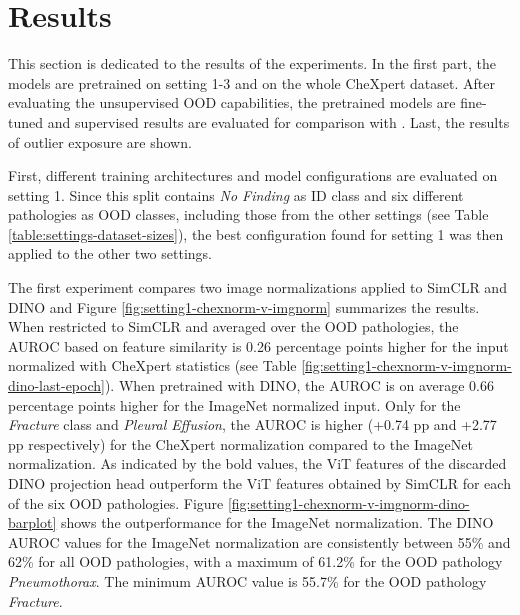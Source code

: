 \section{Results}
\label{section: results}
This section is dedicated to the results of the experiments.
In the first part, the models are pretrained on setting 1-3 and on the whole CheXpert dataset.
After evaluating the unsupervised OOD capabilities, the pretrained models are fine-tuned and supervised results are evaluated for comparison with \citep{Berger2021}.
Last, the results of outlier exposure are shown.
\par
First, different training architectures and model configurations are evaluated on setting 1.
Since this split contains \textit{No Finding} as ID class and six different pathologies as OOD classes, including those from the other settings (see Table \ref{table:settings-dataset-sizes}), the best configuration found for setting 1 was then applied to the other two settings.
\par
The first experiment compares two image normalizations applied to SimCLR and DINO and Figure \ref{fig:setting1-chexnorm-v-imgnorm} summarizes the results.
When restricted to SimCLR and averaged over the OOD pathologies, the AUROC based on feature similarity is 0.26 percentage points higher for the input normalized with CheXpert statistics (see Table \ref{fig:setting1-chexnorm-v-imgnorm-dino-last-epoch}).
When pretrained with DINO, the AUROC is on average 0.66 percentage points higher for the ImageNet normalized input.
Only for the \textit{Fracture} class and \textit{Pleural Effusion}, the AUROC is higher (+0.74 pp and +2.77 pp respectively) for the CheXpert normalization compared to the ImageNet normalization.
As indicated by the bold values, the ViT features of the discarded DINO projection head outperform the ViT features obtained by SimCLR for each of the six OOD pathologies.
Figure \ref{fig:setting1-chexnorm-v-imgnorm-dino-barplot} shows the outperformance for the ImageNet normalization.
The DINO AUROC values for the ImageNet normalization are consistently between 55\% and 62\% for all OOD pathologies, with a maximum of 61.2\% for the OOD pathology \textit{Pneumothorax}.
The minimum AUROC value is 55.7\% for the OOD pathology \textit{Fracture}.
